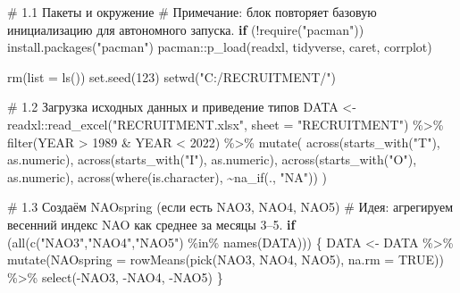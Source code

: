 \documentclass[
  letterpaper,
  DIV=11,
  numbers=noendperiod]{scrreprt}
\newenvironment{Shaded}{\begin{snugshade}}{\end{snugshade}}
\newcommand{\AttributeTok}[1]{\textcolor[rgb]{0.40,0.45,0.13}{#1}}
\newcommand{\CommentTok}[1]{\textcolor[rgb]{0.37,0.37,0.37}{#1}}
\newcommand{\ConstantTok}[1]{\textcolor[rgb]{0.56,0.35,0.01}{#1}}
\newcommand{\ControlFlowTok}[1]{\textcolor[rgb]{0.00,0.23,0.31}{\textbf{#1}}}
\newcommand{\DecValTok}[1]{\textcolor[rgb]{0.68,0.00,0.00}{#1}}
\newcommand{\FunctionTok}[1]{\textcolor[rgb]{0.28,0.35,0.67}{#1}}
\newcommand{\NormalTok}[1]{\textcolor[rgb]{0.00,0.23,0.31}{#1}}
\newcommand{\OtherTok}[1]{\textcolor[rgb]{0.00,0.23,0.31}{#1}}
\newcommand{\SpecialCharTok}[1]{\textcolor[rgb]{0.37,0.37,0.37}{#1}}
\newcommand{\StringTok}[1]{\textcolor[rgb]{0.13,0.47,0.30}{#1}}
\begin{document}
\begin{Shaded}
\begin{Highlighting}[]
\CommentTok{\# 1.1 Пакеты и окружение}
\CommentTok{\# Примечание: блок повторяет базовую инициализацию для автономного запуска.}
\ControlFlowTok{if}\NormalTok{ (}\SpecialCharTok{!}\FunctionTok{require}\NormalTok{(}\StringTok{"pacman"}\NormalTok{)) }\FunctionTok{install.packages}\NormalTok{(}\StringTok{"pacman"}\NormalTok{)}
\NormalTok{pacman}\SpecialCharTok{::}\FunctionTok{p\_load}\NormalTok{(readxl, tidyverse, caret, corrplot)}

\FunctionTok{rm}\NormalTok{(}\AttributeTok{list =} \FunctionTok{ls}\NormalTok{())}
\FunctionTok{set.seed}\NormalTok{(}\DecValTok{123}\NormalTok{)}
\FunctionTok{setwd}\NormalTok{(}\StringTok{"C:/RECRUITMENT/"}\NormalTok{)}

\CommentTok{\# 1.2 Загрузка исходных данных и приведение типов}
\NormalTok{DATA }\OtherTok{\textless{}{-}}\NormalTok{ readxl}\SpecialCharTok{::}\FunctionTok{read\_excel}\NormalTok{(}\StringTok{"RECRUITMENT.xlsx"}\NormalTok{, }\AttributeTok{sheet =} \StringTok{"RECRUITMENT"}\NormalTok{) }\SpecialCharTok{\%\textgreater{}\%}
  \FunctionTok{filter}\NormalTok{(YEAR }\SpecialCharTok{\textgreater{}} \DecValTok{1989} \SpecialCharTok{\&}\NormalTok{ YEAR }\SpecialCharTok{\textless{}} \DecValTok{2022}\NormalTok{) }\SpecialCharTok{\%\textgreater{}\%}
  \FunctionTok{mutate}\NormalTok{(}
    \FunctionTok{across}\NormalTok{(}\FunctionTok{starts\_with}\NormalTok{(}\StringTok{"T"}\NormalTok{), as.numeric),}
    \FunctionTok{across}\NormalTok{(}\FunctionTok{starts\_with}\NormalTok{(}\StringTok{"I"}\NormalTok{), as.numeric),}
    \FunctionTok{across}\NormalTok{(}\FunctionTok{starts\_with}\NormalTok{(}\StringTok{"O"}\NormalTok{), as.numeric),}
    \FunctionTok{across}\NormalTok{(}\FunctionTok{where}\NormalTok{(is.character), }\SpecialCharTok{\textasciitilde{}}\FunctionTok{na\_if}\NormalTok{(., }\StringTok{"NA"}\NormalTok{))}
\NormalTok{  )}

\CommentTok{\# 1.3 Создаём NAOspring (если есть NAO3, NAO4, NAO5)}
\CommentTok{\# Идея: агрегируем весенний индекс NAO как среднее за месяцы 3–5.}
\ControlFlowTok{if}\NormalTok{ (}\FunctionTok{all}\NormalTok{(}\FunctionTok{c}\NormalTok{(}\StringTok{"NAO3"}\NormalTok{,}\StringTok{"NAO4"}\NormalTok{,}\StringTok{"NAO5"}\NormalTok{) }\SpecialCharTok{\%in\%} \FunctionTok{names}\NormalTok{(DATA))) \{}
\NormalTok{  DATA }\OtherTok{\textless{}{-}}\NormalTok{ DATA }\SpecialCharTok{\%\textgreater{}\%}
    \FunctionTok{mutate}\NormalTok{(}\AttributeTok{NAOspring =} \FunctionTok{rowMeans}\NormalTok{(}\FunctionTok{pick}\NormalTok{(NAO3, NAO4, NAO5), }\AttributeTok{na.rm =} \ConstantTok{TRUE}\NormalTok{)) }\SpecialCharTok{\%\textgreater{}\%}
    \FunctionTok{select}\NormalTok{(}\SpecialCharTok{{-}}\NormalTok{NAO3, }\SpecialCharTok{{-}}\NormalTok{NAO4, }\SpecialCharTok{{-}}\NormalTok{NAO5)}
\NormalTok{\}}


\end{Highlighting}
\end{Shaded}
\end{document}
